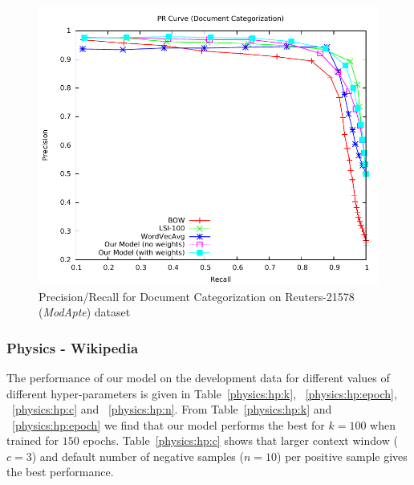 \begin{figure}[tb]
\centering
        \includegraphics[width=0.8\columnwidth]{figs/pr/reuter-cs-scala.pdf}
        \vskip -4mm
    \caption{Precision/Recall for Document Categorization on Reuters-21578 (\emph{ModApte}) dataset} 
    \label{fig:pr:reuter:cs}
\end{figure}

\subsubsection{Physics - Wikipedia}
The performance of our model on the development data for different values of different hyper-parameters is given in Table~\ref{physics:hp:k}, ~\ref{physics:hp:epoch}, ~\ref{physics:hp:c} and ~\ref{physics:hp:n}. From Table~\ref{physics:hp:k} and ~\ref{physics:hp:epoch} we find that our model performs the best for $k=100$ when trained for $150$ epochs. Table~\ref{physics:hp:c} shows that larger context window ($c = 3$) and default number of negative samples ($n = 10$) per positive sample gives the best performance. 

